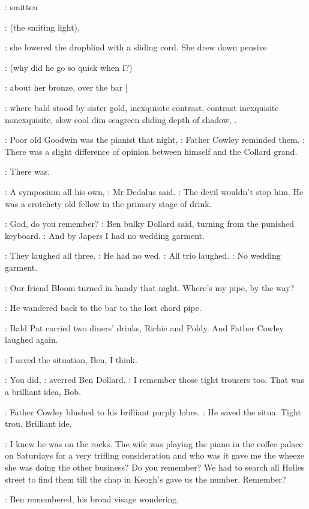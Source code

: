 :
smitten

\MissDInt:
(the smiting light),

:
she lowered the dropblind with a sliding cord.
She drew down pensive

\MissDInt:
(why did he go so quick when I?)

:
about her bronze,
over the bar |

:
where bald stood by sister gold,
inexquisite contrast,
contrast inexquisite nonexquisite,
slow cool dim seagreen sliding depth of shadow,
.

\cowley:
Poor old Goodwin was the pianist that night,
:
Father Cowley reminded them.
\cowley:
There was a slight difference of opinion between himself and the
Collard grand.

:
There was.

\simon:
A symposium all his own,
:
Mr Dedalus said.
\simon:
The devil wouldn't stop him.
He was a crotchety old fellow in the primary stage of drink.

\dollard:
God,
do you remember?
:
Ben bulky Dollard said,
turning from the punished keyboard.
\dollard:
And by Japers I had no wedding garment.

:
They laughed all three.
\simon:
He had no wed.
:
All trio laughed.
\dollard:
No wedding garment.

\simon:
Our friend Bloom turned in handy that night.
Where's
my pipe,
by the way?

:
He wandered back to the bar to the lost chord pipe.

:
Bald Pat carried
two diners' drinks,
Richie and Poldy.
And Father Cowley laughed again.

\cowley:
I saved the situation,
Ben,
I think.

\dollard:
You did,
:
averred Ben Dollard.
\dollard:
I remember those tight trousers too.
That was a brilliant idea,
Bob.

:
Father Cowley blushed to his brilliant purply lobes.
\cowley:
He saved the
situa.
Tight trou.
Brilliant ide.

\cowley:
I knew he was on the rocks.
The wife was playing the piano in
the coffee palace on Saturdays for a very trifling consideration and who
was it gave me the wheeze she was doing the other business?
Do you
remember?
We had to search all Holles street to find them till the chap in
Keogh's gave us the number.
Remember?

:
Ben remembered,
his broad visage wondering.

